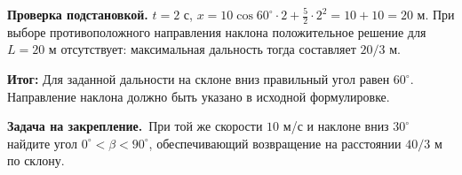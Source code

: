 \documentclass[a4paper,12pt]{article}
\newcommand{\result}[1]{\textcolor{darkaccent}{\textbf{Итог:} #1}}
\newcommand{\practice}{\medskip\textbf{Задача на закрепление.}~}
\begin{document}
\textbf{Проверка подстановкой.} $t=2$ с, $x=10\cos60^\circ\cdot2+\tfrac52\cdot2^2=10+10=20$ м. При выборе противоположного направления наклона положительное решение для $L=20$ м отсутствует: максимальная дальность тогда составляет $20/3$ м.

\result{Для заданной дальности на склоне вниз правильный угол равен $60^\circ$. Направление наклона должно быть указано в исходной формулировке.}

\practice При той же скорости $10$ м/с и наклоне вниз $30^\circ$ найдите угол $0^\circ<\beta<90^\circ$, обеспечивающий возвращение на расстоянии $40/3$ м по склону.
\end{document}
